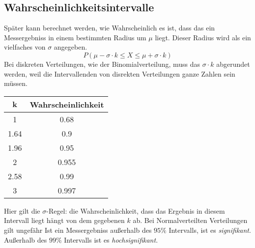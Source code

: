 \documentclass{article}
\begin{document}
\subsection{Wahrscheinlichkeitsintervalle} 
\begin{minipage}{\dimexpr\linewidth-6cm}
Später kann berechnet werden, wie Wahrscheinlich es ist, dass das ein Messergebniss in einem bestimmten Radius um $\mu$ liegt. Dieser Radius wird als ein vielfaches von $\sigma$ angegeben.
\[
 P(\mu-\sigma \cdot k \le X \le \mu+\sigma \cdot k) 
\]
Bei diskreten Verteilungen, wie der Binomialverteilung, muss das $\sigma \cdot k$ abgerundet werden, weil die Intervallenden von disrekten Verteilungen ganze Zahlen sein müssen. 
\end{minipage}
\hfill 
\begin{minipage}{6cm}
\begin{center}
\begin{tabular}{ |c|c| }
\hline
 $\mathbf{k}$ & \textbf{Wahrscheinlichkeit} \\
\hline
 1 & 0.68 \\
\hline
 1.64 & 0.9 \\
\hline
 1.96 & 0.95 \\
\hline
 2 & 0.955 \\
\hline
 2.58 & 0.99 \\
\hline
 3 & 0.997 \\
\hline
\end{tabular}
\end{center}
\end{minipage} 
 
\vspace*{0.3em} 
\noindent Hier gilt die $\sigma$-Regel: die Wahrscheinlichkeit, dass das Ergebnis in diesem Intervall liegt hängt von dem gegebenen $k$ ab. Bei Normalverteilten Verteilungen gilt ungefähr
Ist ein Messergebniss außerhalb des $95\%$ Intervalls, ist es \emph{signifikant}. Außerhalb des $99\%$ Intervalls ist es \emph{hochsignifikant}.
\end{document}
